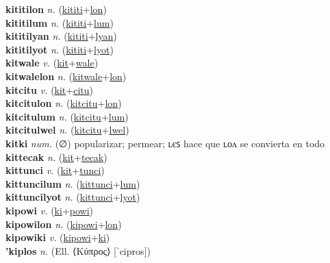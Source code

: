 \textbf{kititilon} \textit{n.} (\hyperref[kititi]{kititi}+\hyperref[lon]{lon})
 \label{kititilon} \\
\textbf{kititilum} \textit{n.} (\hyperref[kititi]{kititi}+\hyperref[lum]{lum})
 \label{kititilum} \\
\textbf{kititilyan} \textit{n.} (\hyperref[kititi]{kititi}+\hyperref[lyan]{lyan})
 \label{kititilyan} \\
\textbf{kititilyot} \textit{n.} (\hyperref[kititi]{kititi}+\hyperref[lyot]{lyot})
 \label{kititilyot} \\
\textbf{kitwale} \textit{v.} (\hyperref[kit]{kit}+\hyperref[wale]{wale})
 \label{kitwale} \\
\textbf{kitwalelon} \textit{n.} (\hyperref[kitwale]{kitwale}+\hyperref[lon]{lon})
 \label{kitwalelon} \\
\textbf{kitcitu} \textit{v.} (\hyperref[kit]{kit}+\hyperref[citu]{citu})
 \label{kitcitu} \\
\textbf{kitcitulon} \textit{n.} (\hyperref[kitcitu]{kitcitu}+\hyperref[lon]{lon})
 \label{kitcitulon} \\
\textbf{kitcitulum} \textit{n.} (\hyperref[kitcitu]{kitcitu}+\hyperref[lum]{lum})
 \label{kitcitulum} \\
\textbf{kitcitulwel} \textit{n.} (\hyperref[kitcitu]{kitcitu}+\hyperref[lwel]{lwel})
 \label{kitcitulwel} \\
\textbf{kitki} \textit{num.} (∅)
popularizar; permear; ʟєꜱ hace que ʟᴏᴧ se convierta en todo \label{kitki} \\
\textbf{kittecak} \textit{n.} (\hyperref[kit]{kit}+\hyperref[tecak]{tecak})
 \label{kittecak} \\
\textbf{kittunci} \textit{v.} (\hyperref[kit]{kit}+\hyperref[tunci]{tunci})
 \label{kittunci} \\
\textbf{kittuncilum} \textit{n.} (\hyperref[kittunci]{kittunci}+\hyperref[lum]{lum})
 \label{kittuncilum} \\
\textbf{kittuncilyot} \textit{n.} (\hyperref[kittunci]{kittunci}+\hyperref[lyot]{lyot})
 \label{kittuncilyot} \\
\textbf{kipowi} \textit{v.} (\hyperref[ki]{ki}+\hyperref[powi]{powi})
 \label{kipowi} \\
\textbf{kipowilon} \textit{n.} (\hyperref[kipowi]{kipowi}+\hyperref[lon]{lon})
 \label{kipowilon} \\
\textbf{kipowiki} \textit{v.} (\hyperref[kipowi]{kipowi}+\hyperref[ki]{ki})
 \label{kipowiki} \\
\textbf{'kiplos} \textit{n.} (Ell. ⟨Κύπρος⟩ [ˈcipros])
